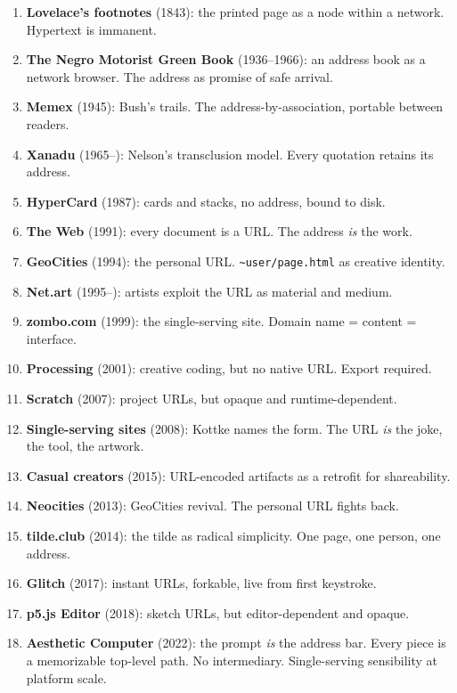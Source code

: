 \documentclass[10pt,letterpaper,twocolumn]{article}
\newcommand{\code}[1]{\texttt{#1}}
\begin{document}
\begin{enumerate}
\item \textbf{Lovelace's footnotes} (1843): the printed page as a node within a network. Hypertext is immanent.
\item \textbf{The Negro Motorist Green Book} (1936--1966): an address book as a network browser. The address as promise of safe arrival.
\item \textbf{Memex} (1945): Bush's trails. The address-by-association, portable between readers.
\item \textbf{Xanadu} (1965--): Nelson's transclusion model. Every quotation retains its address.
\item \textbf{HyperCard} (1987): cards and stacks, no address, bound to disk.
\item \textbf{The Web} (1991): every document is a URL. The address \emph{is} the work.
\item \textbf{GeoCities} (1994): the personal URL. \code{\textasciitilde{}user/page.html} as creative identity.
\item \textbf{Net.art} (1995--): artists exploit the URL as material and medium.
\item \textbf{zombo.com} (1999): the single-serving site. Domain name = content = interface.
\item \textbf{Processing} (2001): creative coding, but no native URL. Export required.
\item \textbf{Scratch} (2007): project URLs, but opaque and runtime-dependent.
\item \textbf{Single-serving sites} (2008): Kottke names the form. The URL \emph{is} the joke, the tool, the artwork.
\item \textbf{Casual creators} (2015): URL-encoded artifacts as a retrofit for shareability.
\item \textbf{Neocities} (2013): GeoCities revival. The personal URL fights back.
\item \textbf{tilde.club} (2014): the tilde as radical simplicity. One page, one person, one address.
\item \textbf{Glitch} (2017): instant URLs, forkable, live from first keystroke.
\item \textbf{p5.js Editor} (2018): sketch URLs, but editor-dependent and opaque.
\item \textbf{Aesthetic Computer} (2022): the prompt \emph{is} the address bar. Every piece is a memorizable top-level path. No intermediary. Single-serving sensibility at platform scale.
\end{enumerate}
\end{document}
